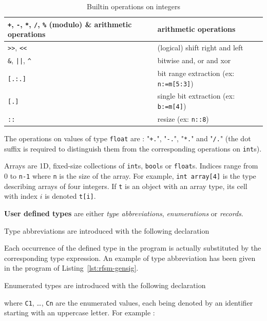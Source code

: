 \begin{table}
\begin{center}
\begin{tabular}{|l|l|} \hline
\verb|+|, \verb|-|, \verb|*|, \verb|/|, \verb|%| (modulo) & arithmetic operations \\ \hline 
\verb|>>|, \verb|<<| & (logical) shift right and left \\ \hline 
\verb|&|, \verb+||+, \verb|^| & bitwise and, or and xor \\ \hline 
\verb|[.:.]| & bit range extraction (ex: \verb|n:=m[5:3]|) \\ \hline 
\verb|[.]| & single bit extraction (ex: \verb|b:=m[4]|) \\ \hline 
\verb|::| & resize (ex: \verb|n::8|) \\ \hline 
\end{tabular}
\label{tab:int-ops}
\caption{Builtin operations on integers}
\end{center}
\end{table}

\step The operations on values of type \texttt{float} are : "\verb|+.|", "\verb|-.|", "\verb|*.|" and
"\verb|/.|" (the dot suffix is required to distinguish them from the corresponding operations on
\texttt{int}s).


\step Arrays are 1D, fixed-size collections of \verb|int|s, \verb|bool|s or \verb|float|s. Indices
range from 0 to \verb|n-1| where \verb|n| is the size of the array. For example,
 \verb|int array[4]| is the type describing arrays of four integers. If \verb|t| is an object
  with an array type, its cell with index $i$ is denoted \verb|t[i]|.


\medskip
\textbf{User defined types} are either \emph{type abbreviations}, \emph{enumerations} or
\emph{records}.

\step Type abbreviations are introduced with the following declaration
\begin{center}
\end{center}
Each occurrence of the defined type in the program is actually substituted by the corresponding type
expression.
An example of type abbreviation has been given in the program of Listing~\ref{lst:rfsm-gensig}. 

\medskip
\step Enumerated types  are introduced with the following declaration
\begin{center}
\end{center}
where \verb|C1|, \ldots, \verb|Cn| are the enumerated values, each being denoted by an identifier
starting with an uppercase letter. For example : 
\begin{center}
\end{center}


